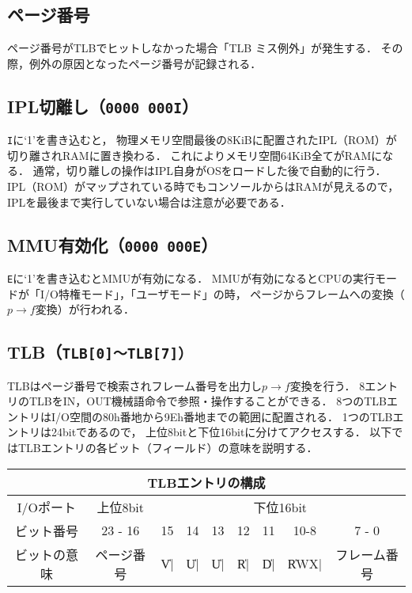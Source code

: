 \subsection{ページ番号}
  ページ番号がTLBでヒットしなかった場合「TLB ミス例外」が発生する．
  その際，例外の原因となったページ番号が記録される．

\subsection{IPL切離し（\texttt{0000 000I}）}
  \texttt{I}に`1'を書き込むと，
  物理メモリ空間最後の8KiBに配置されたIPL（ROM）が切り離されRAMに置き換わる．
  これによりメモリ空間64KiB全てがRAMになる．
  通常，切り離しの操作はIPL自身がOSをロードした後で自動的に行う．
  IPL（ROM）がマップされている時でもコンソールからはRAMが見えるので，
  IPLを最後まで実行していない場合は注意が必要である．

\subsection{MMU有効化（\texttt{0000 000E}）}
  \texttt{E}に`1'を書き込むとMMUが有効になる．
  MMUが有効になるとCPUの実行モードが「I/O特権モード」，「ユーザモード」の時，
  ページからフレームへの変換（$p \to f$変換）が行われる．

\subsection{TLB（\texttt{TLB[0]〜TLB[7]）}}
  TLBはページ番号で検索されフレーム番号を出力し$p \to f$変換を行う．
  8エントリのTLBをIN，OUT機械語命令で参照・操作することができる．
  8つのTLBエントリはI/O空間の80h番地から9Eh番地までの範囲に配置される．
  1つのTLBエントリは24bitであるので，
  上位8bitと下位16bitに分けてアクセスする．
  以下ではTLBエントリの各ビット（フィールド）の意味を説明する．

  \begin{center}
  \small\begin{tabular}{| c || c |c|c|c|c|c|c| c |}\hline
    \multicolumn{9}{|c|}{TLBエントリの構成} \\\hline
    I/Oポート   &上位8bit&\multicolumn{7}{c|}{下位16bit} \\\hline
    ビット番号  &23 - 16&15&14&13&12&11&10-8&7 - 0      \\\hline
    ビットの意味& ページ番号&
    \|V|&\|U|&\|U|&\|R|&\|D|&\|RWX|&フレーム番号\\\hline
  \end{tabular}
  \end{center}

